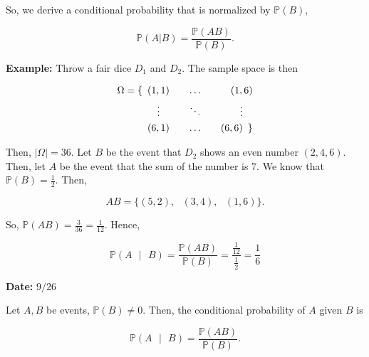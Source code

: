 \documentclass[12pt]{article}
\newcommand{\prob}[1]{\mathbb{P}(#1)}
\begin{document}
\noindent
So, we derive a conditional probability that is normalized by $\prob{B}$,

\begin{equation*}
\prob{A \lvert B} = \frac{\prob{AB}}{\prob{B}}.
\end{equation*}

\begin{tcolorbox}
\textbf{Example:} Throw a fair dice $D_1$ and $D_2$. The sample space is then

\begin{alignat*}{6}
\Omega = \{ \enspace (1,1) &&         \ldots &&                          (1,6) & \\
 	  \quad \vdotswithin{(1,1)} &&           \ddots &&      					\vdotswithin{(1,1)}  & \\
      (6,1) &&\quad            						\ldots &&\quad                  (6,6) \enspace \} &
\end{alignat*}

\noindent
Then, $\lvert \Omega \rvert = 36$. Let $B$ be the event that $D_2$ shows an even number $(2,4,6)$. Then, let $A$ be the event that the sum of the number is $7$. We know that $\prob{B} = \frac{1}{2}$. Then, 

\begin{equation*}
AB = \{ (5,2), \text{ } (3,4), \text{ } (1,6) \}.
\end{equation*}

\noindent
So, $\prob{AB} = \frac{3}{36} = \frac{1}{12}$. Hence, 

\begin{equation*}
\prob{A \text{ } \lvert \text{ } B} = \frac{\prob{AB}}{\prob{B}} = \frac{\frac{1}{12}}{\frac{1}{2}} = \frac{1}{6}
\end{equation*}
\end{tcolorbox}

\begin{flushright}
\textbf{Date:} $9/26$
\end{flushright}

\noindent
Let $A,B$ be events, $\prob{B} \neq 0$. Then, the conditional probability of $A$ given $B$ is

\begin{equation*}
\prob{A \text{ } \lvert \text{ } B} = \frac{\prob{AB}}{\prob{B}}.
\end{equation*}


\end{document}
